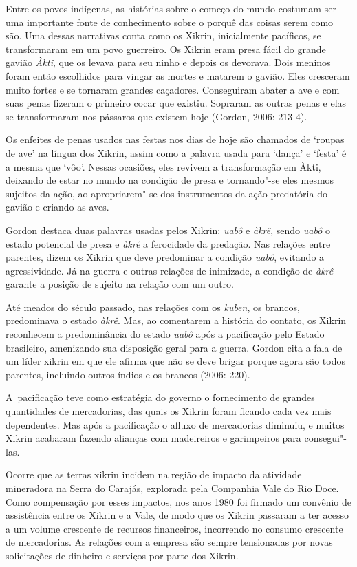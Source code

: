Entre os povos indígenas, as histórias sobre o começo do mundo costumam
ser uma importante fonte de conhecimento sobre o porquê das coisas
serem como são. Uma dessas narrativas conta como os Xikrin,
inicialmente pacíficos, se transformaram em um povo guerreiro. Os
Xikrin eram presa fácil do grande gavião \emph{Àkti}, que os levava para seu
ninho e depois os devorava. Dois meninos foram então escolhidos para
vingar as mortes e matarem o gavião. Eles cresceram muito fortes e se
tornaram grandes caçadores. Conseguiram abater a ave e com suas penas
fizeram o primeiro cocar que existiu. Sopraram as outras penas e elas
se transformaram nos pássaros que existem hoje (Gordon, 2006: 213-4). 

Os enfeites de penas usados nas festas nos dias de hoje são chamados de
`roupas de ave' na língua dos Xikrin, assim como a palavra usada para
`dança' e `festa' é a mesma que `vôo'. Nessas ocasiões, eles revivem a
transformação em Àkti, deixando de estar no mundo na condição de presa e
tornando"-se eles mesmos sujeitos da ação, ao apropriarem"-se dos
instrumentos da ação predatória do gavião e criando as aves.

Gordon destaca duas palavras usadas pelos Xikrin: \emph{uabô} e \emph{àkrê}, sendo
\emph{uabô} o estado potencial de presa e \emph{àkrê} a ferocidade da predação. Nas
relações entre parentes, dizem os Xikrin que deve predominar a condição
\emph{uabô}, evitando a agressividade. Já na guerra e outras relações de
inimizade, a condição de \emph{àkrê} garante a posição de sujeito na relação
com um outro. 

Até meados do século passado, nas relações com os \emph{kuben}, os brancos,
predominava o estado \emph{àkrê}. Mas, ao comentarem a história do contato, os
Xikrin reconhecem a predominância do estado \emph{uabô} após a pacificação
pelo Estado brasileiro, amenizando sua disposição geral para a guerra.
Gordon cita a fala de um líder xikrin em que ele afirma que não se deve
brigar porque agora são todos parentes, incluindo outros índios e os
brancos (2006: 220). 

A~pacificação teve como estratégia do governo o fornecimento de grandes
quantidades de mercadorias, das quais os Xikrin foram ficando cada vez
mais dependentes. Mas após a pacificação o afluxo de mercadorias
diminuiu, e muitos Xikrin acabaram fazendo alianças com madeireiros e
garimpeiros para consegui"-las. 

Ocorre que as terras xikrin incidem na região de impacto da atividade
mineradora na Serra do Carajás, explorada pela Companhia Vale do Rio
Doce. Como compensação por esses impactos, nos anos 1980 foi firmado um
convênio de assistência entre os Xikrin e a Vale, de modo que os Xikrin
passaram a ter acesso a um volume crescente de recursos financeiros,
incorrendo no consumo crescente de mercadorias. As relações com a
empresa são sempre tensionadas por novas solicitações de dinheiro e
serviços por parte dos Xikrin. 

